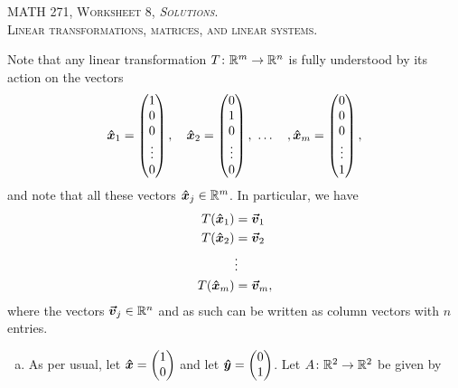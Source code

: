 \documentclass[12pt]{article} %
\begin{document}
\begin{center}
   \textsc{\large MATH 271, Worksheet 8, \emph{Solutions}.}\\
   \textsc{Linear transformations, matrices, and linear systems.}
\end{center}
\vspace{.5cm}

\begin{problem}
    Note that any linear transformation $T\colon \mathbb{R}^m \to \mathbb{R}^n$ is fully understood by its action on the vectors
    \[
        \boldsymbol{\hat{x}}_1 = \begin{pmatrix} 1 \\ 0 \\ 0 \\ \vdots \\ 0 \end{pmatrix}, \quad \boldsymbol{\hat{x}}_2 = \begin{pmatrix} 0 \\ 1 \\ 0 \\ \vdots \\ 0 \end{pmatrix}, ~\dots \quad, \boldsymbol{\hat{x}}_m = \begin{pmatrix} 0 \\ 0 \\ 0 \\ \vdots \\ 1 \end{pmatrix},
    \]
    and note that all these vectors $\boldsymbol{\hat{x}}_j \in \mathbb{R}^m$. In particular, we have
    \begin{align*}
        T(\boldsymbol{\hat{x}}_1) &= \boldsymbol{\boldsymbol{\vec{v}}}_1\\
        T(\boldsymbol{\hat{x}}_2) &= \boldsymbol{\boldsymbol{\vec{v}}}_2\\
                    & \vdots\\
        T(\boldsymbol{\hat{x}}_m) &= \boldsymbol{\boldsymbol{\vec{v}}}_m,\\
    \end{align*}
    where the vectors $\boldsymbol{\boldsymbol{\vec{v}}}_j \in \mathbb{R}^n$ and as such can be written as column vectors with $n$ entries.
    \begin{enumerate}[(a)]
        \item As per usual, let $\boldsymbol{\hat{x}} = \begin{pmatrix} 1 \\ 0 \end{pmatrix}$ and let $\boldsymbol{\hat{y}} = \begin{pmatrix} 0 \\ 1 \end{pmatrix}$. Let $A \colon \mathbb{R}^2 \to \mathbb{R}^2$ be given by

\end{enumerate}
\end{problem}
\end{document}
